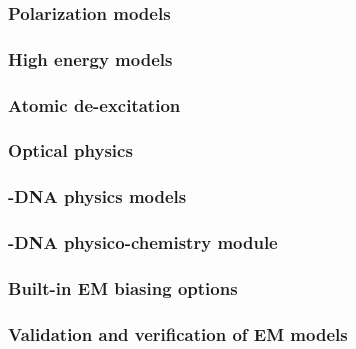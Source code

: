 \subsubsection{Polarization models}\label{sec:em6} %


\subsubsection{High energy models}\label{sec:em61} %


\subsubsection{Atomic de-excitation}\label{sec:em7} %


\subsubsection{Optical physics}\label{sec:em8} %


\subsubsection{\Gfour{}-DNA physics models}\label{sec:em9} %


\subsubsection{\Gfour{}-DNA physico-chemistry module}\label{sec:em10} %



\subsubsection{Built-in EM biasing options}\label{sec:em12} %


\subsubsection{Validation and verification of EM models}\label{sec:em13}


